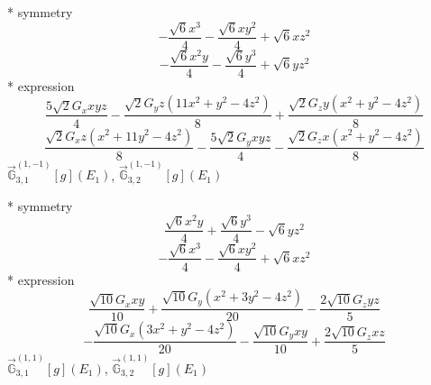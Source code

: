 \documentclass[fleqn,8pt]{jsarticle}
\begin{document}
\noindent\quad ** symmetry
\begin{dmath*}
- \frac{\sqrt{6} x^{3}}{4} - \frac{\sqrt{6} x y^{2}}{4} + \sqrt{6} x z^{2}
\end{dmath*}
\begin{dmath*}
- \frac{\sqrt{6} x^{2} y}{4} - \frac{\sqrt{6} y^{3}}{4} + \sqrt{6} y z^{2}
\end{dmath*}
\noindent\quad ** expression
\begin{dmath*}
\frac{5 \sqrt{2} G_{x} x y z}{4} - \frac{\sqrt{2} G_{y} z \left(11 x^{2} + y^{2} - 4 z^{2}\right)}{8} + \frac{\sqrt{2} G_{z} y \left(x^{2} + y^{2} - 4 z^{2}\right)}{8}
\end{dmath*}
\begin{dmath*}
\frac{\sqrt{2} G_{x} z \left(x^{2} + 11 y^{2} - 4 z^{2}\right)}{8} - \frac{5 \sqrt{2} G_{y} x y z}{4} - \frac{\sqrt{2} G_{z} x \left(x^{2} + y^{2} - 4 z^{2}\right)}{8}
\end{dmath*}
\noindent\quad $\vec{\mathbb{G}}_{3,1}^{(1,-1)}[g](E_{1})$, $\vec{\mathbb{G}}_{3,2}^{(1,-1)}[g](E_{1})$

\noindent\quad ** symmetry
\begin{dmath*}
\frac{\sqrt{6} x^{2} y}{4} + \frac{\sqrt{6} y^{3}}{4} - \sqrt{6} y z^{2}
\end{dmath*}
\begin{dmath*}
- \frac{\sqrt{6} x^{3}}{4} - \frac{\sqrt{6} x y^{2}}{4} + \sqrt{6} x z^{2}
\end{dmath*}
\noindent\quad ** expression
\begin{dmath*}
\frac{\sqrt{10} G_{x} x y}{10} + \frac{\sqrt{10} G_{y} \left(x^{2} + 3 y^{2} - 4 z^{2}\right)}{20} - \frac{2 \sqrt{10} G_{z} y z}{5}
\end{dmath*}
\begin{dmath*}
- \frac{\sqrt{10} G_{x} \left(3 x^{2} + y^{2} - 4 z^{2}\right)}{20} - \frac{\sqrt{10} G_{y} x y}{10} + \frac{2 \sqrt{10} G_{z} x z}{5}
\end{dmath*}
\noindent\quad $\vec{\mathbb{G}}_{3,1}^{(1,1)}[g](E_{1})$, $\vec{\mathbb{G}}_{3,2}^{(1,1)}[g](E_{1})$
\end{document}
